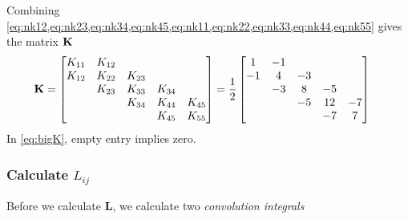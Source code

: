 Combining
\cref{eq:nk12,eq:nk23,eq:nk34,eq:nk45,eq:nk11,eq:nk22,eq:nk33,eq:nk44,eq:nk55}
gives the matrix $\mathbf{K}$
\def\matK{\ensuremath{\frac{1}{2}
    \begin{bmatrix}
      1 & -1 &&&\\
      -1 &4&-3&&\\
      & -3 &8&-5&\\
      &&-5&12&-7\\
      &&&-7&7
    \end{bmatrix}
  }}
\begin{align}
  \K &=
               \begin{bmatrix}
                 K_{11} & K_{12} &&&\\
                 K_{12} & K_{22} &K_{23}&&\\
                 & K_{23} &K_{33}&K_{34}&\\
                 &&K_{34}&K_{44}&K_{45}\\
                 &&&K_{45}&K_{55}
               \end{bmatrix} = \matK{} \label{eq:bigK}
\end{align}
In \cref{eq:bigK}, empty entry implies zero.

\subsubsection*{Calculate $L_{ij}$}
\def\L{\ensuremath{\mathbf{L}}}
Before we calculate \L, we calculate two \emph{convolution integrals}
\newcommand{\Ta}{
  \begin{tikzpicture}
    \tikzstyle{every node}=[font=\scriptsize]
    \def\w{1cm}
    \def\h{0.5cm}
    \useasboundingbox (0,0) rectangle (\w + 15pt, \h);
    \fill[gray] (0,0) -- (\w,\h) -- (\w,0) -- cycle;
    \def\i{0.1cm}
    \draw[thin,<->] (0,-\i) to node[below] {$l$} +(\w,0);
    \draw[thin,<->] (\w + \i,0) to node[right] {1} +(0,\h);
  \end{tikzpicture}
}
\newcommand{\Tb}{
  \begin{tikzpicture}
    \tikzstyle{every node}=[font=\scriptsize]
    \def\w{1cm}
    \def\h{0.5cm}
    \useasboundingbox (-10pt,0) rectangle (\w + 5pt, \h);
    \fill[gray] (0,0) -- (0,\h) -- (\w,0) -- cycle;
    \def\i{0.1cm}
    \draw[thin,<->] (0,-\i) to node[below] {$l$} +(\w,0);
    \draw[thin,<->] (-\i,0) to node[left] {1} +(0,\h);
  \end{tikzpicture}
}

